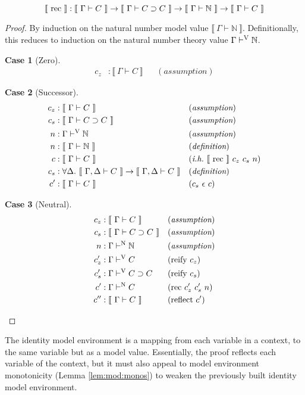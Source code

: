 \documentclass{llncs}
\newtheorem{scase}{Case}
\newcommand{\reflem}[1]{Lemma \ref{lem:#1}}
\def\arr{\supset}
\def\marr{\rightarrow}
\def\nat{\mathbb{N}}
\def\emp{\epsilon}
\def\bydef{(\textit{definition})}
\def\byass{(\textit{assumption})}
\newcommand{\ih}[1]{(\textit{i.h.}~ #1)}
\newcommand{\by}[1]{(#1)}
\newcommand{\turn}[1]{\vdash^\con{#1}}
\newcommand{\all}[1]{\forall#1.~}
\newcommand{\el}[1]{\llbracket ~ #1 ~ \rrbracket}
\newcommand{\con}[1]{\textmd{#1}}
\newcommand{\fun}[1]{\textmd{#1}}
\newcommand{\typm}[1]{\el{\Gamma \vdash #1}}
\newcommand{\gdtypm}[1]{\el{\Gamma, \Delta \vdash #1}}
\newcommand{\typv}[1]{\Gamma \turn{V} #1}
\newcommand{\typn}[1]{\Gamma \turn{N} #1}
\begin{document}
\begin{lemma}
\label{lem:mod:rec}
$$
\el{\fun{rec}} : \typm{C} \marr \typm{C \arr C} \marr \typm{\nat} \marr \typm{C}
$$

\begin{proof}

By induction on the natural number model value $\typm{\nat}$.
Definitionally, this reduces to induction on the natural number theory
value $\typv{\nat}$.

\begin{scase}[Zero]
\begin{align*}
c_z  &: \typm{C} && \byass
\end{align*}
\end{scase}

\begin{scase}[Successor]
\begin{align*}
c_z  &: \typm{C} && \byass\\
c_s  &: \typm{C \arr C} && \byass\\
n    &: \typv{\nat} && \byass\\
n    &: \typm{\nat} && \bydef\\
c    &: \typm{C} && \ih{\el{\fun{rec}}~c_z~c_s~n}\\
c_s  &: \all{\Delta} \gdtypm{C} \marr \gdtypm{C} && \bydef\\
c'   &: \typm{C} && \by{c_s~\emp~c}
\end{align*}
\end{scase}

\begin{scase}[Neutral]
\begin{align*}
c_z  &: \typm{C} && \byass\\
c_s  &: \typm{C \arr C} && \byass\\
n    &: \typn{\nat} && \byass\\
c_z' &: \typv{C} && \by{\fun{reify}~c_z}\\
c_s' &: \typv{C \arr C} && \by{\fun{reify}~c_s}\\
c'   &: \typn{C} && \by{\fun{rec}~c_z'~c_s'~n}\\
c''  &: \typm{C} && \by{\fun{reflect}~c'}
\end{align*}
\end{scase}

\end{proof}

\end{lemma}


The identity model environment is a mapping from each variable in a
context, to the same variable but as a model value. Essentially, the
proof reflects each variable of the context, but it must also appeal
to model environment monotonicity (\reflem{mod:monos}) to weaken the
previously built identity model environment.
\end{document}
